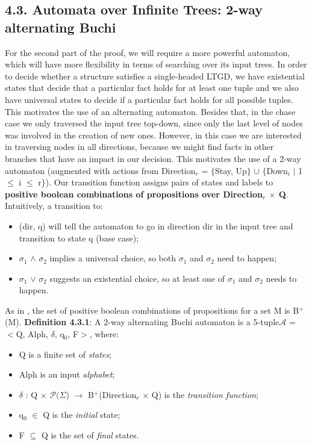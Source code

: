 \documentclass[11pt, a4paper, dvipsnames]{article}
\begin{document}
\subsection{4.3. Automata over Infinite Trees: 2-way alternating Buchi}
For the second part of the proof, we will require a more powerful automaton, which will have more flexibility in terms of searching over its input trees. \newline
In order to decide whether a structure satisfies a single-headed LTGD, we have existential states that decide that a particular fact holds for at least one tuple and we also have universal states to decide if a particular fact holds for all possible tuples. This motivates the use of an alternating automaton.\newline
Besides that, in the chase case we only traversed the input tree top-down, since only the last level of nodes was involved in the creation of new ones. However, in this case we are interested in traversing nodes in all directions, because we might find facts in other branches that have an impact in our decision. This motivates the use of a 2-way automaton (augmented with actions from Direction$_{r}$ = $\{$Stay, Up$\}$ $\cup$ $\{$Down$_{i}$ $|$ 1 $\leq$ i $\leq$ r$\}$). \newline
Our transition function assigns pairs of states and labels to \textbf{positive boolean combinations of propositions over Direction$_{r}$ $\times$ Q}. Intuitively, a transition to:
\begin{itemize}
	\item (dir, q) will tell the automaton to go in direction dir in the input tree and transition to state q (base case);
	\item $\sigma_{1}$ $\wedge$ $\sigma_{2}$ implies a universal choice, so both $\sigma_{1}$ and $\sigma_{2}$ need to happen;
	\item  $\sigma_{1}$ $\vee$ $\sigma_{2}$ suggests an existential choice, so at least one of $\sigma_{1}$ and $\sigma_{2}$ needs to happen.
\end{itemize}
As in \cite{decidable}, the set of positive boolean combinations of propositions for a set M is B$^{+}$(M).\newline
\textbf{Definition 4.3.1}: A 2-way alternating B$\ddot{u}$chi automaton is a 5-tuple\newline $\mathcal{A}$ = $<$Q, Alph, $\delta$, q$_{0}$, F$>$, where:
\begin{itemize}
	\item Q is a finite set of \textit{states};
	\item Alph is an input \textit{alphabet};
	\item $\delta$ : Q $\times$ $\mathcal{P}(\Sigma$) $\rightarrow$ B$^{+}$(Direction$_{r}$ $\times$ Q) is the \textit{transition function};
	\item q$_{0}$ $\in$ Q is the \textit{initial} state;
	\item F $\subseteq$ Q is the set of \textit{final} states.
\end{itemize}
\end{document}
